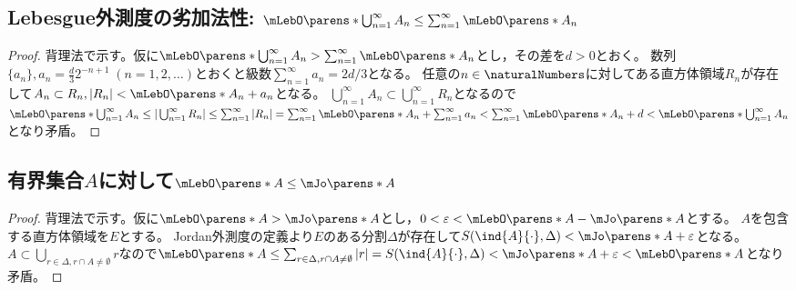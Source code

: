         \subsection{Lebesgue外測度の劣加法性: \texorpdfstring{$\mLebO\parens*{\bigcup_{n=1}^\infty A_n} \leq \sum_{n=1}^\infty \mLebO\parens*{A_n}$}{}}
            \begin{proof}
                背理法で示す。仮に$\mLebO\parens*{\bigcup_{n=1}^\infty A_n} > \sum_{n=1}^\infty \mLebO\parens*{A_n}$とし，その差を$d>0$とおく。
                数列$\{a_n\},a_n = \frac{d}{3}2^{-n+1}\;(n=1,2,\dotsc)$とおくと級数$\sum_{n=1}^\infty a_n = 2d/3$となる。
                任意の$n\in\naturalNumbers$に対してある直方体領域$R_n$が存在して$A_n\subset R_n,|R_n| < \mLebO\parens*{A_n} + a_n$となる。
                $\bigcup_{n=1}^\infty A_n \subset \bigcup_{n=1}^\infty R_n$となるので$\mLebO\parens*{\bigcup_{n=1}^\infty A_n} \leq |\bigcup_{n=1}^\infty R_n| \leq \sum_{n=1}^\infty |R_n| = \sum_{n=1}^\infty \mLebO\parens*{A_n} + \sum_{n=1}^\infty a_n < \sum_{n=1}^\infty \mLebO\parens*{A_n} + d < \mLebO\parens*{\bigcup_{n=1}^\infty A_n}$となり矛盾。
            \end{proof}
        \subsection{有界集合\texorpdfstring{$A$}{A}に対して\texorpdfstring{$\mLebO\parens*{A}\leq\mJo\parens*{A}$}{Lebesgue外測度≤Jordan外測度}}
            \label{subsec: Lebesgue外測度≦Jordan外測度}
            \begin{proof}
                背理法で示す。仮に$\mLebO\parens*{A} > \mJo\parens*{A}$とし，$0<\varepsilon<\mLebO\parens*{A} - \mJo\parens*{A}$とする。
                $A$を包含する直方体領域を$E$とする。
                Jordan外測度の定義より$E$のある分割$\Delta$が存在して$S(\ind{A}{\cdot},\Delta) < \mJo\parens*{A} + \varepsilon$となる。
                $A \subset \bigcup_{r\in\Delta,r\cap A\neq\emptyset}r$なので$\mLebO\parens*{A} \leq \sum_{r\in\Delta,r\cap A\neq\emptyset}|r| = S(\ind{A}{\cdot},\Delta) < \mJo\parens*{A} + \varepsilon < \mLebO\parens*{A}$となり矛盾。
            \end{proof}
